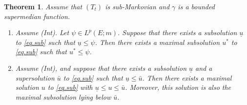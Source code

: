 \documentclass[11pt,a4paper,reqno]{amsart}
\newtheorem{theorem}{\bf Theorem}[section]
\theoremstyle{definition}
\numberwithin{equation}{section}
\begin{document}
\begin{theorem}
\label{th.im4}
Assume that $(T_t)$ is sub-Markovian and $\gamma$ is a bounded supermedian function. 
\begin{enumerate}
\item[(1)] Assume  (Int). Let $\psi \in L^p(E;m)$. Suppose that there exists a subsolution $\underline{u}$ 
to \eqref{eq.sub} such that $\underline{u} \leq \psi$. Then there exists a maximal subsolution 
$u^*$ to  \eqref{eq.sub}  such that $u^* \leq \psi $.
\item[(2)] Assume (Int), and  suppose that there exists a subsolution $\underline{u}$ and a supersolution $\bar{u}$ 
to  \eqref{eq.sub}  such that $\underline{u} \leq \bar{u}$. 
Then there exists a maximal solution $u$ to  \eqref{eq.sub}  with  $\underline{u} \leq u \leq \bar{u}$. 
Moreover, this solution is also the  maximal subsolution lying below $\bar{u}$.
\end{enumerate}
\end{theorem}
\end{document}
